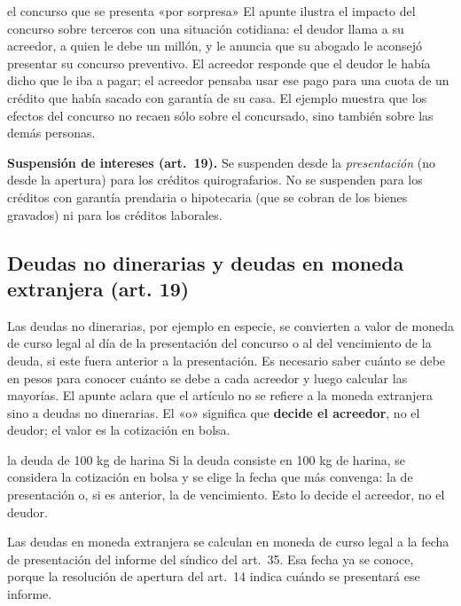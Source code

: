 \documentclass[12pt,oneside]{book}
\begin{document}
\begin{example}{el concurso que se presenta «por sorpresa»}
El apunte ilustra el impacto del concurso sobre terceros con una situación cotidiana: el deudor llama a su acreedor, a quien le debe un millón, y le anuncia que su abogado le aconsejó presentar su concurso preventivo. El acreedor responde que el deudor le había dicho que le iba a pagar; el acreedor pensaba usar ese pago para una cuota de un crédito que había sacado con garantía de su casa. El ejemplo muestra que los efectos del concurso no recaen sólo sobre el concursado, sino también sobre las demás personas.
\end{example}

\begin{important}
\textbf{Suspensión de intereses (art.~19).} Se suspenden desde la \textit{presentación} (no desde la apertura) para los créditos quirografarios. No se suspenden para los créditos con garantía prendaria o hipotecaria (que se cobran de los bienes gravados) ni para los créditos laborales.
\end{important}

\subsection{Deudas no dinerarias y deudas en moneda extranjera (art. 19)}

Las deudas no dinerarias, por ejemplo en especie, se convierten a valor de moneda de curso legal al día de la presentación del concurso o al del vencimiento de la deuda, si este fuera anterior a la presentación. Es necesario saber cuánto se debe en pesos para conocer cuánto se debe a cada acreedor y luego calcular las mayorías. El apunte aclara que el artículo no se refiere a la moneda extranjera sino a deudas no dinerarias. El «o» significa que \textbf{decide el acreedor}, no el deudor; el valor es la cotización en bolsa.

\begin{example}{la deuda de 100 kg de harina}
Si la deuda consiste en 100 kg de harina, se considera la cotización en bolsa y se elige la fecha que más convenga: la de presentación o, si es anterior, la de vencimiento. Esto lo decide el acreedor, no el deudor.
\end{example}

Las deudas en moneda extranjera se calculan en moneda de curso legal a la fecha de presentación del informe del síndico del art.~35. Esa fecha ya se conoce, porque la resolución de apertura del art.~14 indica cuándo se presentará ese informe.
\end{document}
